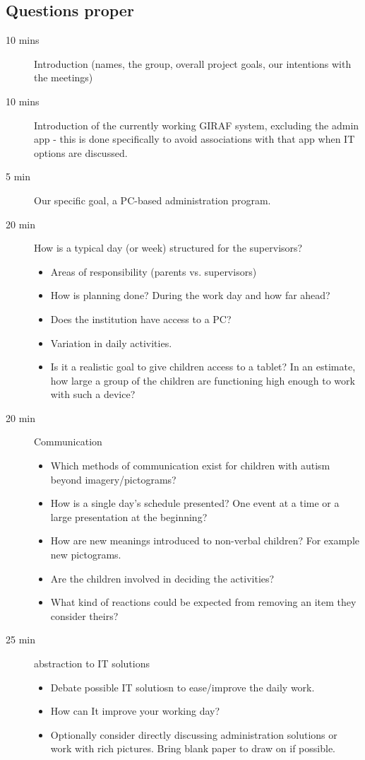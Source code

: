 \subsection{Questions proper}
\begin{description}
	\item[10 mins] Introduction (names, the group, overall project goals, our intentions with the meetings)
	\item[10 mins] Introduction of the currently working GIRAF system, excluding the admin app - this is done specifically to avoid associations with that app when IT options are discussed.
	\item[5 min] Our specific goal, a PC-based administration program.
	\item[20 min] How is a typical day (or week) structured for the supervisors?
		\begin{itemize}
			\item Areas of responsibility (parents vs. supervisors)
			\item How is planning done? During the work day and how far ahead?
			\item Does the institution have access to a PC?
			\item Variation in daily activities.
			\item Is it a realistic goal to give children access to a tablet? In an estimate, how large a group of the children are functioning high enough to work with such a device?
		\end{itemize}
	\item[20 min] Communication
		\begin{itemize}
			\item Which methods of communication exist for children with autism beyond imagery/pictograms?
			\item How is a single day's schedule presented? One event at a time or a large presentation at the beginning?
			\item How are new meanings introduced to non-verbal children? For example new pictograms.
			\item Are the children involved in deciding the activities?
			\item What kind of reactions could be expected from removing an item they consider theirs?
		\end{itemize}
	\item[25 min] abstraction to IT solutions
		\begin{itemize}
			\item Debate possible IT solutiosn to ease/improve the daily work.
			\item How can It improve your working day?
			\item Optionally consider directly discussing administration solutions or work with rich pictures. Bring blank paper to draw on if possible.
		\end{itemize}
\end{description}